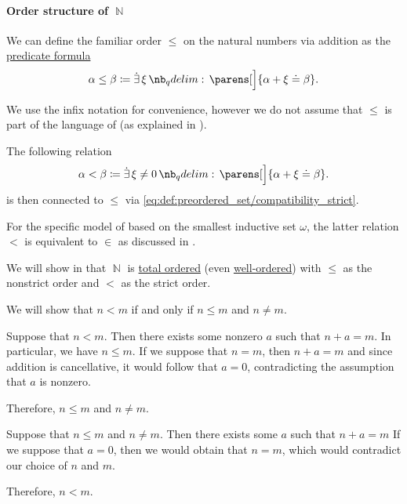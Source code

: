 \paragraph{Order structure of \( \BbbN \)}

\begin{definition}\label{def:natural_numbers_ordering}
  We can define the familiar order \( \leq \) on the natural numbers via addition as the \hyperref[con:predicate_formula]{predicate formula}
  \begin{equation}\label{eq:def:natural_numbers_ordering/predicate}
    \alpha \leq \beta \coloneqq \qexists \xi \parens[\Big]{ \alpha + \xi \syneq \beta }.
  \end{equation}

  We use the infix notation for convenience, however we do not assume that \( \leq \) is part of the language of  (as explained in ).

  The following relation
  \begin{equation}\label{eq:def:natural_numbers_ordering/strict_predicate}
    \alpha < \beta \coloneqq \qexists {\xi \neq 0} \parens[\Big]{ \alpha + \xi \syneq \beta }.
  \end{equation}
  is then connected to \( \leq \) via \eqref{eq:def:preordered_set/compatibility_strict}.
\end{definition}
\begin{comments}
  \item For the specific model of  based on the smallest inductive set \( \omega \), the latter relation \( < \) is equivalent to \( \in \) as discussed in .
  \item We will show in  that \( \BbbN \) is \hyperref[def:totally_ordered_set]{total ordered} (even \hyperref[def:well_ordered_set]{well-ordered}) with \( \leq \) as the nonstrict order and \( < \) as the strict order.
\end{comments}
\begin{defproof}
  We will show that \( n < m \) if and only if \( n \leq m \) and \( n \neq m \).

  \SufficiencySubProof Suppose that \( n < m \). Then there exists some nonzero \( a \) such that \( n + a = m \). In particular, we have \( n \leq m \). If we suppose that \( n = m \), then \( n + a = m \) and since addition is cancellative, it would follow that \( a = 0 \), contradicting the assumption that \( a \) is nonzero.

  Therefore, \( n \leq m \) and \( n \neq m \).

  \NecessitySubProof Suppose that \( n \leq m \) and \( n \neq m \). Then there exists some \( a \) such that \( n + a = m \) If we suppose that \( a = 0 \), then we would obtain that \( n = m \), which would contradict our choice of \( n \) and \( m \).

  Therefore, \( n < m \).
\end{defproof}

